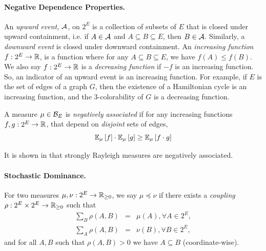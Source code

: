 \paragraph{Negative Dependence Properties.}
An {\em upward event}, ${\cal A}$, on $2^E$ is a collection of subsets of $E$ that is closed  under upward containment, i.e. if $A\in{\cal A}$ and $A\subseteq B\subseteq E$, then $B\in{\cal A}$. Similarly, a {\em downward event} is closed  under downward  containment.
An {\em increasing function} $f:2^E\rightarrow \mathbb{R}$, is a function where for any $A\subseteq B\subseteq E$, we have $f(A)\leq f(B)$. We also say $f:2^E\to\mathbb{R}$ is a {\em decreasing function} if $-f$ is an increasing function.
So, an indicator of an upward event is an increasing function.
For example, if $E$ is the set of edges of a graph $G$, then the existence of a Hamiltonian cycle is an increasing function, and the $3$-colorability of $G$ is a decreasing function.

\begin{definition}
\label{def:negativeassociation}
A measure $\mu \in {\cal B}_E$ is {\em negatively associated} if 
for any increasing functions $f,g: 2^E\to \mathbb{R}$, that depend on {\em disjoint} sets of edges,
$$ {\mathbb{E}}_{\mu}\left[f\right]\cdot {\mathbb{E}}_{\mu}\left[g\right] \geq  {\mathbb{E}}_{\mu}\left[f\cdot g\right] $$
\end{definition}
It is shown in \cite{BBL09,FM92}  that strongly Rayleigh measures
are negatively associated. 

\paragraph{Stochastic Dominance.}
For two measures $\mu,\nu:2^{E}\to\mathbb{R}_{\geq 0}$, we say $\mu \preceq \nu$ if there exists a {\em coupling} $\rho: 2^{E}\times 2^{E} \to\mathbb{R}_{\geq 0}$ such that 
\begin{eqnarray*}
	\sum_B \rho(A,B)&=&\mu(A), \forall A\in 2^{E},\\
	\sum_A \rho(A,B)&=& \nu(B), \forall B\in 2^{E},
\end{eqnarray*} 
and for all $A,B$ such that $\rho(A,B)>0$ we have $A\subseteq B$ (coordinate-wise).


